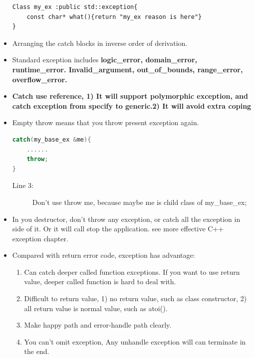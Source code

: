 \documentclass[a4paper,11pt,twoside]{book}
\begin{document}
\begin{itemize}
\begin{lstlisting}[numbers=none]
Class my_ex :public std::exception{
	const char* what(){return "my_ex reason is here"}
}
\end{lstlisting}
	
	\item Arranging the catch blocks in inverse order of derivation.
	
	\item Standard exception includes \textbf{logic\_error, domain\_error,  runtime\_error.  Invalid\_argument, out\_of\_bounds, range\_error, overflow\_error.}
	
	\item \textbf{Catch use reference, 1) It will support polymorphic exception, and catch exception from specify to generic.2) It will avoid extra coping}
	
\item Empty throw means that you throw present exception again.
	\begin{lstlisting}[frame=single, language=c++]
catch(my_base_ex &me){
	......
	throw;
}
\end{lstlisting}
\begin{description}
	\item[Line 3:] 	Don't use throw me, because maybe me is child class of my\_base\_ex;
\end{description}
	
	\item In you destructor, don't throw any exception, or catch all the exception in side of it. Or it will call stop the application. see more effective C++ exception chapter.
	
	\item Compared with return error code, exception has advantage:
	\begin{enumerate}
		\item  Can catch deeper called function exceptions. If you want to use return value, deeper called function is hard to deal with.
		
		\item Difficult to return value, 1) no return value, such as class constructor, 2) all return value is normal value, such as atoi().
		
		\item Make happy path and error-handle path clearly.
		
		\item You can't omit exception, Any unhandle exception will can terminate in the end.
	\end{enumerate}
	
\end{itemize}
\end{document}
